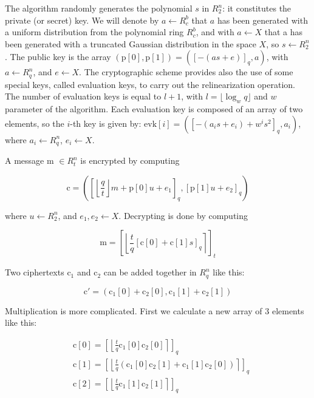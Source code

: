 The algorithm randomly generates the polynomial $s$ in $R^n_2$: it constitutes the private (or secret) key. We will denote by $a \leftarrow R^b_c$ that $a$ has been generated with a uniform distribution from the polynomial ring $R^b_c$, and with $a \leftarrow X$ that a has been generated with a truncated Gaussian distribution in the space $X$, so $s \leftarrow R^n_2$. The public key is the array $(\text{p}[0], \text{p}[1]) = ([-(as + e)]_q, a)$, with $a \leftarrow R^n_q$, and $e \leftarrow X$. The cryptographic scheme provides also the use of some special keys, called evaluation keys, to carry out the relinearization operation. The number of evaluation keys is equal to $l + 1$, with $l=\lfloor \log_w q \rfloor$ and $w$ parameter of the algorithm. Each evaluation key is composed of an array of two elements, so the $i$-th key is given by: $\text{evk}[i] = ([-(a_is+e_i)+w^is^2]_q, a_i)$, where $a_i \leftarrow R^n_q$, $e_i \leftarrow X$.

A message m $\in R^n_t$ is encrypted by computing

\begin{equation*}
    \text{c} = \left(\left[\left \lfloor \frac{q}{t} \right \rfloor m + \text{p}[0] u + e_1 \right]_q , [\text{p}[1] u + e_2 ]_q\right) 
\end{equation*}

\noindent where $u \leftarrow R^n_2$, and $e_1, e_2 \leftarrow X$. Decrypting is done by computing

\begin{equation*}
    \text{m} = \left[\left\lfloor  \frac{t}{q}  [\text{c}[0] + \text{c}[1] s]_q  \right\rceil\right]_t
\end{equation*}

Two ciphertexts $\text{c}_1$ and $\text{c}_2$ can be added together in $R^n_q$ like this:

\begin{equation*}
    \text{c}'=(\text{c}_1[0] + \text{c}_2[0], \text{c}_1[1] + \text{c}_2[1])
\end{equation*}

Multiplication is more complicated. First we calculate a new array of 3 elements like this:

\begin{align*}
    &\text{c}[0] = \left[\left\lfloor\frac{t}{q}\text{c}_1[0]\text{c}_2[0]\right\rceil\right]_q\\
    &\text{c}[1] = \left[\left\lfloor\frac{t}{q}(\text{c}_1[0]\text{c}_2[1]+\text{c}_1[1]\text{c}_2[0])\right\rceil\right]_q\\
    &\text{c}[2] = \left[\left\lfloor\frac{t}{q}\text{c}_1[1]\text{c}_2[1]\right\rceil\right]_q
\end{align*}

